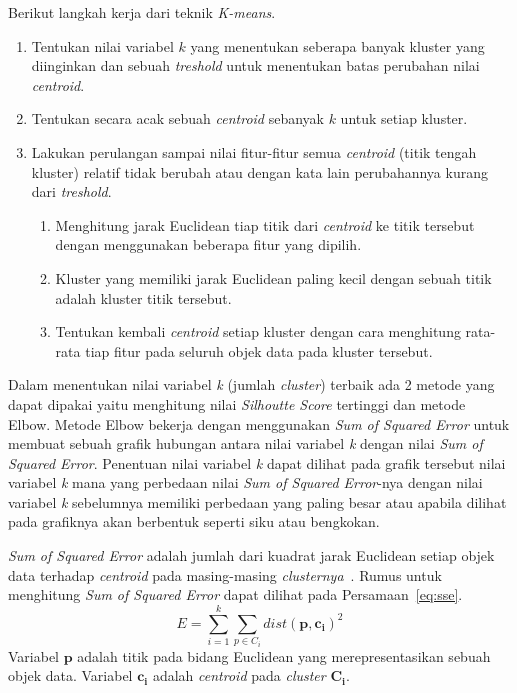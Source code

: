 Berikut langkah kerja dari teknik \textit{K-means}.~\cite{jiawei:12:datmin}
\begin{enumerate}
	\item Tentukan nilai variabel \(k\) yang menentukan seberapa banyak kluster yang diinginkan dan sebuah \textit{treshold} untuk menentukan batas perubahan nilai \textit{centroid}.
	\item Tentukan secara acak sebuah \textit{centroid} sebanyak \(k\)  untuk setiap kluster.
	\item Lakukan perulangan sampai nilai fitur-fitur semua \textit{centroid} (titik tengah kluster) relatif tidak berubah atau dengan kata lain perubahannya kurang dari \textit{treshold}.
	\begin{enumerate}
		\item Menghitung jarak Euclidean tiap titik dari \textit{centroid} ke titik tersebut dengan menggunakan beberapa fitur yang dipilih.
		\item Kluster yang memiliki jarak Euclidean paling kecil dengan sebuah titik adalah kluster titik tersebut.
		\item Tentukan kembali \textit{centroid} setiap kluster dengan cara menghitung rata-rata tiap fitur pada seluruh objek data pada kluster tersebut.
	\end{enumerate}
\end{enumerate}

Dalam menentukan nilai variabel \textit{k} (jumlah \textit{cluster}) terbaik ada 2 metode yang dapat dipakai yaitu menghitung nilai \textit{Silhoutte Score} tertinggi dan metode Elbow. Metode Elbow bekerja dengan menggunakan  \textit{Sum of Squared Error} untuk membuat sebuah grafik hubungan antara nilai variabel \textit{k} dengan nilai \textit{Sum of Squared Error}. Penentuan nilai variabel \textit{k} dapat dilihat pada grafik tersebut nilai variabel \textit{k} mana yang perbedaan nilai \textit{Sum of Squared Error}-nya dengan nilai variabel \textit{k} sebelumnya memiliki perbedaan yang paling besar atau apabila dilihat pada grafiknya akan berbentuk seperti siku atau bengkokan.

\textit{Sum of Squared Error} adalah jumlah dari kuadrat jarak Euclidean setiap objek data terhadap \textit{centroid} pada masing-masing \textit{clusternya}~\cite{jiawei:12:datmin}. Rumus untuk menghitung \textit{Sum of Squared Error} dapat dilihat pada Persamaan~\ref{eq:sse}.
\begin{equation}\label{eq:sse}
	E = \sum^{k}_{i=1} \sum^{}_{p \in C_{i}} dist(\boldsymbol{p,c_{i}})^2
\end{equation}
Variabel \(\boldsymbol{p}\) adalah titik pada bidang Euclidean yang merepresentasikan sebuah objek data. Variabel \(\boldsymbol{c_{i}}\) adalah \textit{centroid} pada \textit{cluster} \(\boldsymbol{C_{i}}\).


